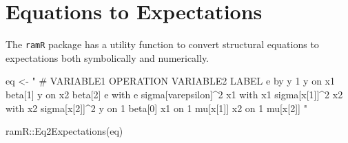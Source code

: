 \documentclass[
]{book}
\newenvironment{Shaded}{\begin{snugshade}}{\end{snugshade}}
\newcommand{\FunctionTok}[1]{\textcolor[rgb]{0.00,0.00,0.00}{#1}}
\newcommand{\NormalTok}[1]{#1}
\newcommand{\OtherTok}[1]{\textcolor[rgb]{0.56,0.35,0.01}{#1}}
\newcommand{\SpecialCharTok}[1]{\textcolor[rgb]{0.00,0.00,0.00}{#1}}
\newcommand{\StringTok}[1]{\textcolor[rgb]{0.31,0.60,0.02}{#1}}
\theoremstyle{definition}
\theoremstyle{definition}
\theoremstyle{definition}
\theoremstyle{remark}
\begin{document}
\hypertarget{equations-to-expectations-1}{%
\section{Equations to Expectations}\label{equations-to-expectations-1}}

The \texttt{ramR} package has a utility function
to convert structural equations to expectations
both symbolically and numerically.

\begin{Shaded}
\begin{Highlighting}[]
\NormalTok{eq }\OtherTok{\textless{}{-}} \StringTok{"}
\StringTok{  \# VARIABLE1 OPERATION VARIABLE2 LABEL}
\StringTok{  e           by        y         1}
\StringTok{  y           on        x1        beta[1]}
\StringTok{  y           on        x2        beta[2]}
\StringTok{  e           with      e         sigma[varepsilon]\^{}2}
\StringTok{  x1          with      x1        sigma[x[1]]\^{}2}
\StringTok{  x2          with      x2        sigma[x[2]]\^{}2}
\StringTok{  y           on        1         beta[0]}
\StringTok{  x1          on        1         mu[x[1]]}
\StringTok{  x2          on        1         mu[x[2]]}
\StringTok{"}
\end{Highlighting}
\end{Shaded}

\begin{Shaded}
\begin{Highlighting}[]
\NormalTok{ramR}\SpecialCharTok{::}\FunctionTok{Eq2Expectations}\NormalTok{(eq)}
\end{Highlighting}
\end{Shaded}
\end{document}
